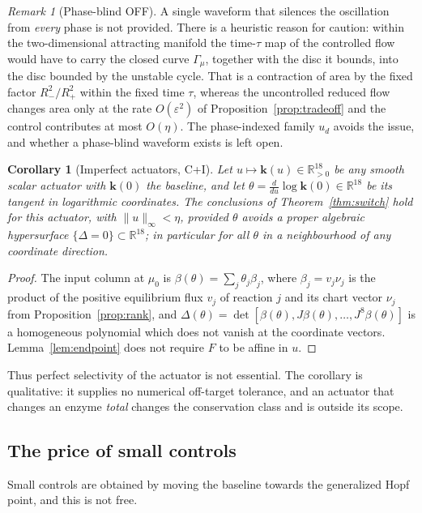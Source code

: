 \documentclass[11pt,a4paper]{article}
\theoremstyle{plain}
\newtheorem{corollary}[theorem]{Corollary}
\theoremstyle{definition}
\theoremstyle{remark}
\newtheorem{remark}[theorem]{Remark}
\newcommand{\R}{\mathbb R}
\newcommand{\norm}[1]{\lVert#1\rVert}
\newcommand{\evC}{\textsf{C}}
\newcommand{\evI}{\textsf{I}}
\begin{document}
\begin{remark}[Phase-blind OFF]\label{rem:phaseblind}
A single waveform that silences the oscillation from \emph{every} phase is not provided. There is a heuristic reason for caution: within the two-dimensional attracting manifold the time-$\tau$ map of the controlled flow would have to carry the closed curve $\Gamma_\mu$, together with the disc it bounds, into the disc bounded by the unstable cycle. That is a contraction of area by the fixed factor $R_-^2/R_+^2$ within the fixed time $\tau$, whereas the uncontrolled reduced flow changes area only at the rate $O(\varepsilon^2)$ of Proposition~\ref{prop:tradeoff} and the control contributes at most $O(\eta)$. The phase-indexed family $u_d$ avoids the issue, and whether a phase-blind waveform exists is left open.
\end{remark}

\begin{corollary}[Imperfect actuators, \evC+\evI]\label{cor:actuator}
Let $u\mapsto\mathbf k(u)\in\R^{18}_{>0}$ be any smooth scalar actuator with $\mathbf k(0)$ the baseline, and let $\theta=\frac{d}{du}\log\mathbf k(0)\in\R^{18}$ be its tangent in logarithmic coordinates. The conclusions of Theorem~\ref{thm:switch} hold for this actuator, with $\norm u_\infty<\eta$, provided $\theta$ avoids a proper algebraic hypersurface $\{\Delta=0\}\subset\R^{18}$; in particular for all $\theta$ in a neighbourhood of any coordinate direction.
\end{corollary}
\begin{proof}
The input column at $\mu_0$ is $\beta(\theta)=\sum_j\theta_j\beta_j$, where $\beta_j=v_j\nu_j$ is the product of the positive equilibrium flux $v_j$ of reaction $j$ and its chart vector $\nu_j$ from Proposition~\ref{prop:rank}, and $\Delta(\theta)=\det[\beta(\theta),J\beta(\theta),\dots,J^8\beta(\theta)]$ is a homogeneous polynomial which does not vanish at the coordinate vectors. Lemma~\ref{lem:endpoint} does not require $F$ to be affine in $u$.
\end{proof}
Thus perfect selectivity of the actuator is not essential. The corollary is qualitative: it supplies no numerical off-target tolerance, and an actuator that changes an enzyme \emph{total} changes the conservation class and is outside its scope.

\subsection{The price of small controls}
Small controls are obtained by moving the baseline towards the generalized Hopf point, and this is not free.
\end{document}

